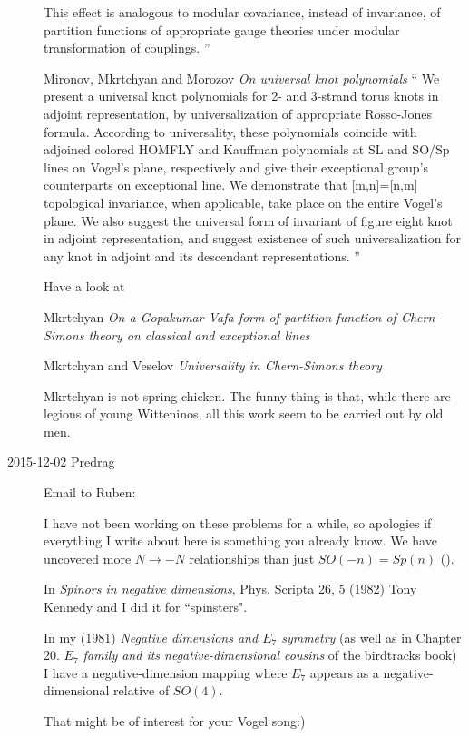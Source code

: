 \begin{description}
This effect is  analogous to modular covariance, instead of invariance,
of partition functions of appropriate gauge theories under modular
transformation of couplings.
''

Mironov, Mkrtchyan and Morozov
{\em On universal knot polynomials}
``
We present a universal knot polynomials for 2- and 3-strand torus knots
in adjoint representation, by universalization of appropriate Rosso-Jones
formula. According to universality, these polynomials coincide with
adjoined colored HOMFLY and Kauffman polynomials at SL and SO/Sp lines on
Vogel's plane, respectively and give their exceptional group's
counterparts on exceptional line. We demonstrate that [m,n]=[n,m]
topological invariance, when applicable, take place on the entire Vogel's
plane. We also suggest the universal form of invariant of figure eight
knot in adjoint representation, and suggest existence of such
universalization for any knot in adjoint and its descendant
representations.
''

Have a look at

Mkrtchyan {\em On a {Gopakumar-Vafa} form of
partition function of {Chern-Simons} theory on classical and exceptional
lines}

Mkrtchyan and Veselov
{\em Universality in {Chern-Simons} theory}

Mkrtchyan is not spring chicken. The funny thing is that, while there are
legions of young Witteninos, all this work seem to be carried out by old
men.



\item[2015-12-02  Predrag]
Email to Ruben:

I have not been working on these problems for a while, so apologies if
everything I write about here is something you already know. We have
uncovered more $N \to -N$ relationships than just $SO(-n)=Sp(n)$
().

In {\em Spinors in negative dimensions},
Phys. Scripta 26, 5 (1982) Tony Kennedy and I did it for ``spinsters".

In my (1981) {\em Negative dimensions and $E_7$ symmetry}
 (as well as in Chapter 20. {\em $E_7$ family and its
negative-dimensional cousins} of the birdtracks book) I have a
negative-dimension mapping where $E_7$  appears as a
negative-dimensional relative of $SO(4)$.

That might be of interest for your Vogel song:)


\end{description}
